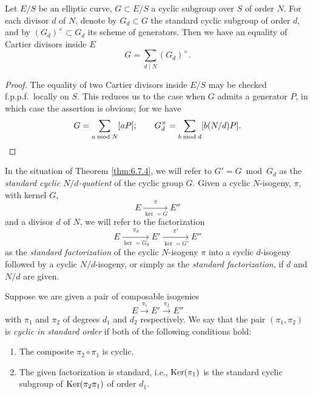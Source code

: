 \begin{kcor}\label{cor:6.7.5}
Let $E/S$ be an elliptic curve, $G \subset E/S$ a cyclic subgroup over $S$ of order $N$. For each divisor $d$ of $N$, denote by $G_d \subset G$ the standard cyclic subgroup of order $d$, and by $(G_d)^\times \subset G_d$ its scheme of generators. Then we have an equality of Cartier divisors inside $E$
\[
G = \sum_{d \mid N} (G_d)^\times .
\]
\end{kcor}

\begin{proof}
The equality of two Cartier divisors inside $E/S$ may be checked f.p.p.f.\ locally on $S$. This reduces us to the case when $G$ admits a generator $P$, in which case the assertion is obvious; for we have
\[
G = \sum_{a \bmod N} [aP]; \qquad G_d^\times = \sum_{b \bmod d} [b(N/d)P]. \qedhere
\]
\end{proof}

\begin{pitem}\label{km:6.7.6}
In the situation of Theorem \ref{thm:6.7.4}, we will refer to $G' = G \bmod G_d$ as the \emph{standard cyclic $N/d$-quotient} of the cyclic group $G$. Given a cyclic $N$-isogeny, $\pi$, with kernel $G$,
\[
E \xrightarrow[\ker = G]{\pi} E''
\]
and a divisor $d$ of $N$, we will refer to the factorization
\[
E \xrightarrow[\ker = G_d]{\pi_d} E' \xrightarrow[\ker = G']{\pi'} E''
\]
as the \emph{standard factorization} of the cyclic $N$-isogeny $\pi$ into a cyclic $d$-isogeny followed by a cyclic $N/d$-isogeny, or simply as the \emph{standard factorization}, if $d$ and $N/d$ are given.
\end{pitem}

\begin{pitem}\label{km:6.7.7}
Suppose we are given a pair of composable isogenies
\[
E \xrightarrow{\pi_1} E' \xrightarrow{\pi_2} E''
\]
with $\pi_1$ and $\pi_2$ of degrees $d_1$ and $d_2$ respectively. We say that the pair $(\pi_1,\pi_2)$ is \emph{cyclic in standard order} if both of the following conditions hold:
\begin{enumerate}[(1)]
\item The composite $\pi_2 \circ \pi_1$ is cyclic.
\item The given factorization is standard, i.e., $\operatorname{Ker}(\pi_1)$ is the standard cyclic subgroup of $\operatorname{Ker}(\pi_2\pi_1)$ of order $d_1$.
\end{enumerate}
\end{pitem}

